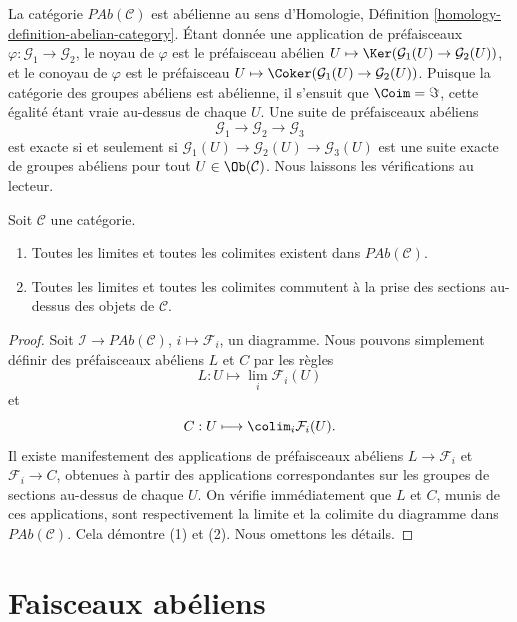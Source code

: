 \medskip\noindent
La catégorie $\textit{PAb}(\mathcal{C})$ est abélienne au sens d'Homologie,
Définition \ref{homology-definition-abelian-category}. Étant donnée une
application de préfaisceaux $\varphi : \mathcal{G}_1 \to \mathcal{G}_2$, le
noyau de $\varphi$ est le préfaisceau abélien
$U \mapsto \Ker(\mathcal{G}_1(U) \to \mathcal{G}_2(U))$, et le conoyau de
$\varphi$ est
le préfaisceau $U \mapsto
\Coker(\mathcal{G}_1(U) \to \mathcal{G}_2(U))$. Puisque la catégorie des
groupes abéliens est abélienne, il s'ensuit que $\Coim = \Im$, cette égalité
étant vraie au-dessus de chaque $U$. Une suite de préfaisceaux abéliens
$$
\mathcal{G}_1 \longrightarrow
\mathcal{G}_2 \longrightarrow
\mathcal{G}_3
$$
est exacte si et seulement si
$\mathcal{G}_1(U) \to \mathcal{G}_2(U) \to \mathcal{G}_3(U)$
est une suite exacte de groupes abéliens pour tout $U \in \Ob(\mathcal{C})$.
Nous laissons les vérifications au lecteur.

\begin{lemma}
\label{lemma-limits-colimits-abelian-presheaves}
Soit $\mathcal{C}$ une catégorie.
\begin{enumerate}
\item Toutes les limites et toutes les colimites existent dans
$\textit{PAb}(\mathcal{C})$.
\item Toutes les limites et toutes les colimites commutent à la prise des
sections au-dessus des objets de $\mathcal{C}$.
\end{enumerate}
\end{lemma}

\begin{proof}
Soit $\mathcal{I} \to \textit{PAb}(\mathcal{C})$, $i \mapsto \mathcal{F}_i$,
un diagramme. Nous pouvons simplement définir des préfaisceaux abéliens $L$ et
$C$ par les règles
$$
L : U \longmapsto \lim_i \mathcal{F}_i(U)
$$
et
$$
C : U \longmapsto \colim_i \mathcal{F}_i(U).
$$
Il existe manifestement des applications de préfaisceaux abéliens
$L \to \mathcal{F}_i$ et $\mathcal{F}_i \to C$, obtenues à partir des
applications correspondantes sur les groupes de sections au-dessus de chaque
$U$. On vérifie immédiatement que $L$ et $C$, munis de ces applications, sont
respectivement la limite et la colimite du diagramme dans
$\textit{PAb}(\mathcal{C})$. Cela démontre (1) et (2). Nous omettons les
détails.
\end{proof}


\section{Faisceaux abéliens}
\label{section-abelian-sheaves}

